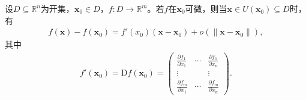 \documentclass[../../main.tex]{subfiles}%
\begin{document}
\begin{theorem}\label{theorem:多元函数可微的导数与偏导的关系}
设$D \subseteq \mathbb{R}^n$为开集，$\bm{x}_0 \in D$，$f: D \to \mathbb{R}^m$。若$f$在$\bm{x}_0$可微，则当$\bm{x} \in U(\bm{x}_0) \subseteq D$时，有
\begin{align*}
f(\bm{x}) - f(\bm{x}_0) = f'(x_0)(\bm{x} - \bm{x}_0) + o\left( \|\bm{x} - \bm{x}_0\| \right),
\end{align*}
其中
\begin{align*}
f'(\bm{x}_0) = \mathrm{D}f(\bm{x}_0) = \begin{pmatrix}
\frac{\partial f_1}{\partial x_1} & \cdots & \frac{\partial f_1}{\partial x_n} \\
\vdots & & \vdots \\
\frac{\partial f_m}{\partial x_1} & \cdots & \frac{\partial f_m}{\partial x_n}
\end{pmatrix}
.
\end{align*}
\end{theorem}
\end{document}
